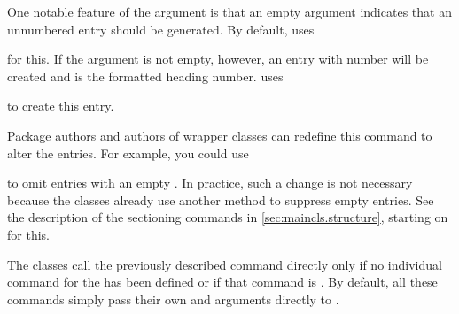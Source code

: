 One notable feature of the  argument is that an empty argument
indicates that an unnumbered entry should be generated. By default,
\KOMAScript{} uses
\begin{quote}
\end{quote}
for this. If the argument is not empty, however, an entry with number
will be created and  is the formatted heading
number. \KOMAScript{} uses
\begin{quote}\raggedright
\end{quote}
to create this entry.

Package authors and authors of wrapper classes can redefine this command to
alter the entries. For example, you could use
\begin{lstcode}
  \renewcommand{\addtocentrydefault}[3]{%
    \IfArgIsEmpty{#3}{%
      \IfArgIsEmpty{#2}{%
        \addcontentsline{toc}{#1}{#3}%
      }{%
        \addcontentsline{toc}{#1}{\protect\numberline{#2}#3}%
      }%
    }%
  }%
\end{lstcode}
to omit entries with an empty . In
practice, such a change is not necessary because the \KOMAScript{} classes
already use another method to suppress empty entries. See the description of
the sectioning commands in \autoref{sec:maincls.structure}, starting on
 for this.%
%
\EndIndexGroup


\begin{Declaration}
\end{Declaration}%
The \KOMAScript{} classes call the previously described
command
%
 directly only if no
individual command for the  has been defined or if that command
is . By default, all
these commands simply pass their own  and arguments directly to
.%
%
\EndIndexGroup


